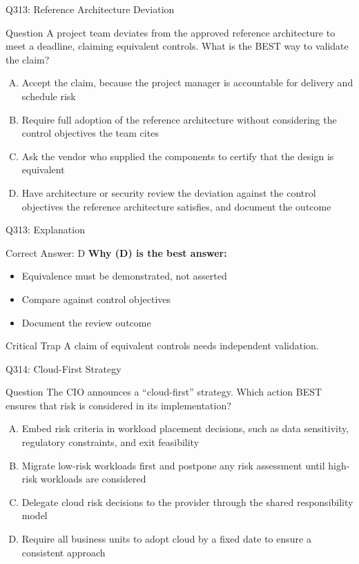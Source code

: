 \documentclass{beamer}
\begin{document}
	\begin{frame}{Q313: Reference Architecture Deviation}
		\begin{block}{Question}
			\small A project team deviates from the approved reference architecture to meet a deadline, claiming equivalent controls. What is the BEST way to validate the claim?
		\end{block}
		\begin{enumerate}[(A)]
			\footnotesize
			\item Accept the claim, because the project manager is accountable for delivery and schedule risk
			\item Require full adoption of the reference architecture without considering the control objectives the team cites
			\item Ask the vendor who supplied the components to certify that the design is equivalent
			\item Have architecture or security review the deviation against the control objectives the reference architecture satisfies, and document the outcome
		\end{enumerate}
	\end{frame}
	
	\begin{frame}{Q313: Explanation}
		\begin{block}{Correct Answer: D}
			\textbf{Why (D) is the best answer:}
			\begin{itemize}
				\item Equivalence must be demonstrated, not asserted
				\item Compare against control objectives
				\item Document the review outcome
			\end{itemize}
		\end{block}
		\begin{alertblock}{Critical Trap}
			A claim of equivalent controls needs independent validation.
		\end{alertblock}
	\end{frame}
	
	\begin{frame}{Q314: Cloud-First Strategy}
		\begin{block}{Question}
			\small The CIO announces a ``cloud-first'' strategy. Which action BEST ensures that risk is considered in its implementation?
		\end{block}
		\begin{enumerate}[(A)]
			\footnotesize
			\item Embed risk criteria in workload placement decisions, such as data sensitivity, regulatory constraints, and exit feasibility
			\item Migrate low-risk workloads first and postpone any risk assessment until high-risk workloads are considered
			\item Delegate cloud risk decisions to the provider through the shared responsibility model
			\item Require all business units to adopt cloud by a fixed date to ensure a consistent approach
		\end{enumerate}
	\end{frame}
	
\end{document}
